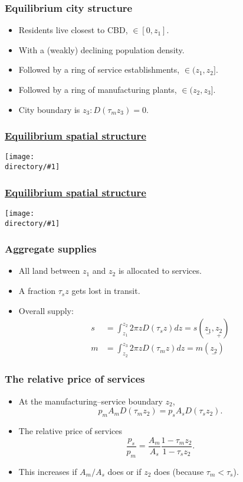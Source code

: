 \documentclass[handout,compress,mathserif]{beamer}
\newcommand{\directory}{figures}
\newcommand{\widefigure}[2]{\begin{frame}\frametitle{\hyperlink{#1back}{#2}}\hypertarget{#1}{{\begin{center}\texttt{[image: \\directory/\#1]}\end{center}}}\end{frame}}
\begin{document}
\begin{frame}\frametitle{Equilibrium city structure}
\begin{itemize}
    \item Residents live closest to CBD, $\in[0,z_1]$.
    \item With a (weakly) declining population density.
    \item Followed by a ring of service establishments, $\in(z_1,z_2]$.
    \item Followed by a ring of manufacturing plants, $\in(z_2,z_3]$.
    \item City boundary is $z_3: D(\tau_m z_3)=0$.
\end{itemize}
\end{frame}

\widefigure{bid-rent-3}{Equilibrium spatial structure}

\widefigure{monocentric-3}{Equilibrium spatial structure}

\begin{frame}\frametitle{Aggregate supplies}
\begin{itemize}
    \item All land between $z_1$ and $z_2$ is allocated to services.
    \item A fraction $\tau_s z$ gets lost in transit.
    \item Overall supply:
    \begin{align*}
    s &= \int_{z_1}^{z_2}2\pi z D(\tau_s z) dz = s(\underset{-}{z_1},\underset{+}{z_2})\\
    m &= \int_{z_2}^{z_3}2\pi z D(\tau_m z) dz = m(\underset{-}{z_2})
    \end{align*}
\end{itemize}
\end{frame}

\begin{frame}\frametitle{The relative price of services}
\begin{itemize}
    \item At the manufacturing--service boundary $z_2$,
    \[
    p_mA_mD(\tau_m z_2) = p_sA_sD(\tau_s z_2).
    \]
    \item The relative price of services
    \[
    \frac{p_s}{p_m} = \frac{A_m}{A_s}\frac{1-\tau_m z_2}{1-\tau_s z_2}.
    \]
    \item This increases if $A_m/A_s$ does or if $z_2$ does (because $\tau_m<\tau_s$).
\end{itemize}
\end{frame}
\end{document}
